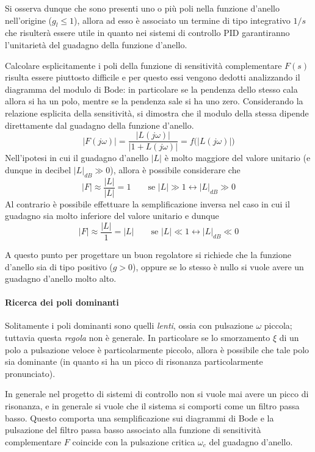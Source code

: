 		Si osserva dunque che sono presenti uno o più poli nella funzione d'anello nell'origine ($g_l \leq 1$), allora ad esso è associato un termine di tipo integrativo $1/s$ che risulterà essere utile in quanto nei sistemi di controllo PID garantiranno l'unitarietà del guadagno della funzione d'anello.
		
		\vspace{3mm}
		Calcolare esplicitamente i poli della funzione di sensitività complementare $F(s)$ risulta essere piuttosto difficile  e per questo essi vengono dedotti analizzando il diagramma del modulo di Bode: in particolare se la pendenza dello stesso cala allora si ha un polo, mentre se la pendenza sale si ha uno zero.
		Considerando la relazione esplicita della sensitività, si dimostra che il modulo della stessa dipende direttamente dal guadagno della funzione d'anello.
		\[ |F(j\omega)| = \frac{|L(j\omega)|}{|1+L(j\omega)|} = f\big(|L(j\omega)|\big) \]
		Nell'ipotesi in cui il guadagno d'anello $|L|$ è molto maggiore del valore unitario (e dunque in decibel $|L|_{dB} \gg 0 $), allora è possibile considerare che
		\[ |F| \approx \frac{|L|}{|L|} = 1 \qquad \textrm{se } |L| \gg 1 \leftrightarrow |L|_{dB} \gg 0 \]
		Al contrario è possibile effettuare la semplificazione inversa nel caso in cui il guadagno sia molto inferiore del valore unitario e dunque
		\[ |F| \approx \frac{|L|}{1} = |L| \qquad \textrm{se } |L| \ll 1 \leftrightarrow |L|_{dB} \ll 0 \]
		
		A questo punto per progettare un buon regolatore si richiede che la funzione d'anello sia di tipo positivo ($g>0$), oppure se lo stesso è nullo si vuole avere un guadagno d'anello molto alto.
		
		\paragraph{Ricerca dei poli dominanti} Solitamente i poli dominanti sono quelli \textit{lenti}, ossia con pulsazione $\omega$ piccola; tuttavia questa \textit{regola} non è generale. In particolare se lo smorzamento $\xi$ di un polo a pulsazione veloce è particolarmente piccolo, allora è possibile che tale polo sia dominante (in quanto si ha un picco di risonanza particolarmente pronunciato).
		
		In generale nel progetto di sistemi di controllo  non si vuole mai avere un picco di risonanza, e in generale si vuole che il sistema si comporti come un filtro passa basso. Questo comporta una semplificazione sui diagrammi di Bode e la pulsazione del filtro passa basso associato alla funzione di sensitività complementare $F$ coincide con la pulsazione critica $\omega_c$ del guadagno d'anello.
		
